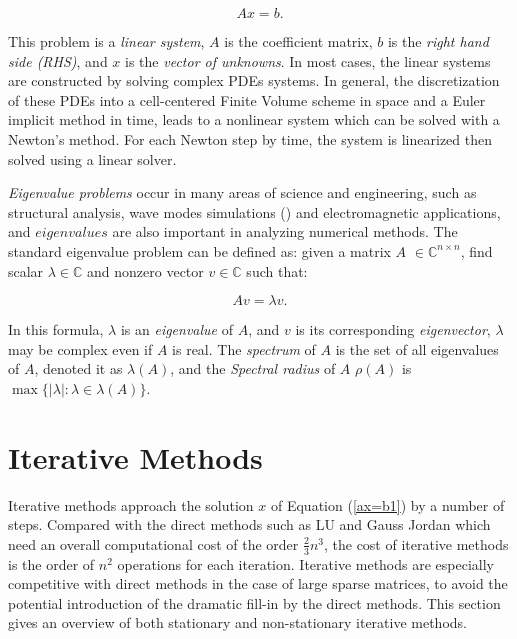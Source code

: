 \begin{equation}
\label{ax=b1}
Ax=b.
\end{equation}

This problem is a \textit{linear system}, $A$ is the coefficient matrix, $b$ is the \textit{right hand side (RHS)}, and $x$ is the \textit{vector of unknowns}. In most cases, the linear systems are constructed by solving complex PDEs systems. In general, the discretization of these PDEs into a cell-centered Finite Volume scheme in space and a Euler implicit method in time, leads to a nonlinear system which can be solved with a Newton’s method. For each Newton step by time, the system is linearized then solved using a linear solver.

\textit{Eigenvalue problems} occur in many areas of science and engineering, such as structural analysis, wave modes simulations (\cite{liu2018highly}) and electromagnetic applications, and $eigenvalues$ are also important in analyzing numerical methods. The standard eigenvalue problem can be defined as: given a matrix $A$ $\in \mathbb{C}^{n \times n}$, find scalar $\lambda \in \mathbb{C}$ and nonzero vector $v \in \mathbb{C}$ such that: 

\begin{equation}
\label{av=lv}
Av=\lambda v.
\end{equation}

In this formula, $\lambda$ is an \textit{eigenvalue} of $A$, and $v$ is its corresponding \textit{eigenvector}, $\lambda$ may be complex even if $A$ is real. The \textit{spectrum} of $A$ is the set of all eigenvalues of $A$, denoted it as $\lambda(A)$, and the \textit{Spectral radius} of $A$ $\rho(A)$ is $\max\{|\lambda|: \lambda \in \lambda(A)\}$. 

\section{Iterative Methods}

Iterative methods approach the solution $x$ of Equation (\ref{ax=b1}) by a number of steps. Compared with the direct methods such as LU and Gauss Jordan which need an overall computational cost of the order $\frac{2}{3}n^3$, the cost of iterative methods is the order of $n^2$ operations for each iteration. Iterative methods are especially competitive with direct methods in the case of large sparse matrices, to avoid the potential introduction of the dramatic fill-in by the direct methods. This section gives an overview of both stationary and non-stationary iterative methods.

